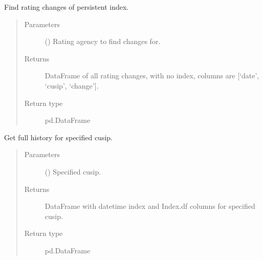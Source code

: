 \documentclass[letterpaper,10pt,english]{report}
\begin{document}
\begin{fulllineitems}
\begin{fulllineitems}
\label{\detokenize{index:lgimapy.index.Index.find_rating_changes}}
Find rating changes of persistent index.
\begin{quote}\begin{description}
\item[{Parameters}] \leavevmode
{} (\sphinxstyleliteralemphasis{\sphinxupquote{, }}\sphinxstyleliteralemphasis{\sphinxupquote{, }}) \textendash{} Rating agency to find changes for.

\item[{Returns}] \leavevmode
{} \textendash{} DataFrame of all rating changes, with no index,
columns are {[}‘date’, ‘cusip’, ‘change’{]}.

\item[{Return type}] \leavevmode
pd.DataFrame

\end{description}\end{quote}

\end{fulllineitems}


\begin{fulllineitems}
\label{\detokenize{index:lgimapy.index.Index.get_cusip_history}}
Get full history for specified cusip.
\begin{quote}\begin{description}
\item[{Parameters}] \leavevmode
{} () \textendash{} Specified cusip.

\item[{Returns}] \leavevmode
{} \textendash{} DataFrame with datetime index and Index.df columns for
specified cusip.

\item[{Return type}] \leavevmode
pd.DataFrame


\end{description}
\end{quote}
\end{fulllineitems}
\end{fulllineitems}
\end{document}
